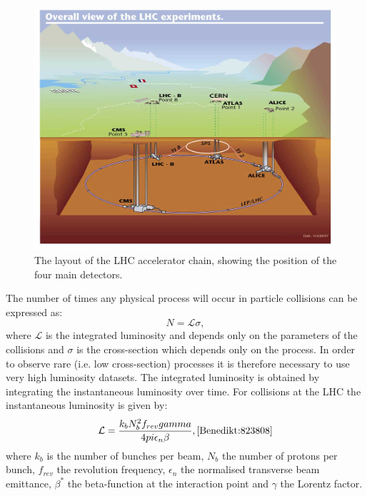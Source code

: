 \begin{figure}
  \includegraphics[width=\largefigwidth]{plots/detector/lhc_layout_sch.jpg}
  \caption{The layout of the LHC accelerator chain, showing the position of the four main detectors.}%
  \label{fig:lhclayout}
\end{figure}

The number of times any physical process will occur in particle collisions can be expressed as:
\begin{equation}
  N = \mathcal{L}\sigma,
\end{equation}
where $\mathcal{L}$ is the integrated luminosity and depends only on the parameters of the collisions and $\sigma$ is the cross-section which depends only on the process. In order to observe rare (i.e. low cross-section) processes it is therefore necessary to use very high luminosity datasets. The integrated luminosity is obtained by integrating the instantaneous luminosity over time. For collisions at the LHC the instantaneous luminosity is given by:
\begin{equation}
  \mathcal{L}=\frac{k_{b}N_{b}^{2}f_{rev}\gamma}{4\pi\epsilon_{n}\beta}, \cite{Benedikt:823808}
\end{equation}
where $k_{b}$ is the number of bunches per beam, $N_{b}$ the number of protons per bunch, $f_{rev}$ the revolution frequency, $\epsilon_{n}$ the normalised transverse beam emittance, $\beta^{*}$ the beta-function at the interaction point and $\gamma$ the Lorentz factor. %


